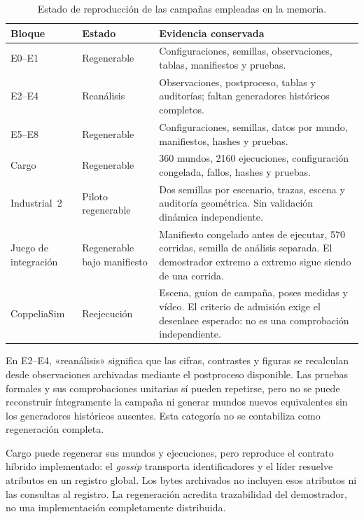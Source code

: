 \begin{table}[!htbp]
  \centering
  \caption{Estado de reproducción de las campañas empleadas en la memoria.}
  \label{tab:reproducibility-status}
  \viutablefont
  \setlength{\tabcolsep}{3pt}
  \begin{tabularx}{\textwidth}{@{}p{2.3cm}p{2.4cm}X@{}}
    \toprule
    Bloque & Estado & Evidencia conservada \\
    \midrule
    E0--E1 & Regenerable & Configuraciones, semillas, observaciones, tablas, manifiestos y pruebas. \\
    E2--E4 & Reanálisis & Observaciones, postproceso, tablas y auditorías; faltan generadores históricos completos. \\
    E5--E8 & Regenerable & Configuraciones, semillas, datos por mundo, manifiestos, hashes y pruebas. \\
    Cargo & Regenerable & 360 mundos, 2160 ejecuciones, configuración congelada, fallos, hashes y pruebas. \\
    Industrial~2 & Piloto regenerable & Dos semillas por escenario, trazas, escena y auditoría geométrica. Sin validación dinámica independiente. \\
    Juego de integración & Regenerable bajo manifiesto & Manifiesto congelado antes de ejecutar, 570 corridas, semilla de análisis separada. El demostrador extremo a extremo sigue siendo de una corrida. \\
    CoppeliaSim & Reejecución & Escena, guion de campaña, poses medidas y vídeo. El criterio de admisión exige el desenlace esperado: no es una comprobación independiente. \\
    \bottomrule
  \end{tabularx}
  \viuownsource
\end{table}

En E2--E4, «reanálisis» significa que las cifras, contrastes y figuras se
recalculan desde observaciones archivadas mediante el postproceso disponible.
Las pruebas formales y sus comprobaciones unitarias sí pueden repetirse, pero
no se puede reconstruir íntegramente la campaña ni generar mundos nuevos
equivalentes sin los generadores históricos ausentes. Esta categoría no se
contabiliza como regeneración completa.

Cargo puede regenerar sus mundos y ejecuciones, pero reproduce el contrato
híbrido implementado: el \emph{gossip} transporta identificadores y el líder
resuelve atributos en un registro global. Los bytes archivados no incluyen esos
atributos ni las consultas al registro. La regeneración acredita trazabilidad
del demostrador, no una implementación completamente distribuida.

